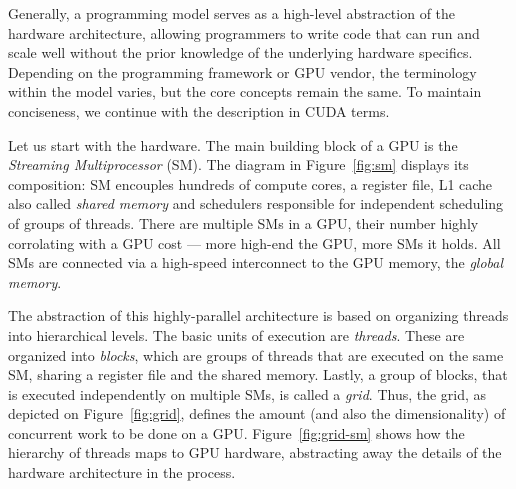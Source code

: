 Generally, a programming model serves as a high-level abstraction of the hardware architecture, allowing programmers to write code that can run and scale well without the prior knowledge of the underlying hardware specifics. Depending on the programming framework or GPU vendor, the terminology within the model varies, but the core concepts remain the same. To maintain conciseness, we continue with the description in CUDA terms.

Let us start with the hardware. The main building block of a GPU is the \emph{Streaming Multiprocessor} (SM). The diagram in Figure~\ref{fig:sm} displays its composition: SM encouples hundreds of compute cores, a register file, L1 cache also called \emph{shared memory} and schedulers responsible for independent scheduling of groups of threads. There are multiple SMs in a GPU, their number highly corrolating with a GPU cost --- more high-end the GPU, more SMs it holds. All SMs are connected via a high-speed interconnect to the GPU memory, the \emph{global memory}.

The abstraction of this highly-parallel architecture is based on organizing threads into hierarchical levels. The basic units of execution are \emph{threads}. These are organized into \emph{blocks}, which are groups of threads that are executed on the same SM, sharing a register file and the shared memory. Lastly, a group of blocks, that is executed independently on multiple SMs, is called a \emph{grid}. Thus, the grid, as depicted on Figure~\ref{fig:grid}, defines the amount (and also the dimensionality) of concurrent work to be done on a GPU. Figure~\ref{fig:grid-sm} shows how the hierarchy of threads maps to GPU hardware, abstracting away the details of the hardware architecture in the process.

